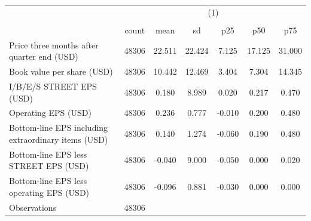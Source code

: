 {
\def\sym#1{\ifmmode^{#1}\else\(^{#1}\)\fi}
\begin{tabular}{l*{1}{cccccc}}
\hline\hline
                    &\multicolumn{6}{c}{(1)}                                                      \\
                    &\multicolumn{6}{c}{}                                                         \\
                    &       count&        mean&          sd&         p25&         p50&         p75\\
\hline
Price three months after quarter end (USD)&       48306&      22.511&      22.424&       7.125&      17.125&      31.000\\
Book value per share (USD)&       48306&      10.442&      12.469&       3.404&       7.304&      14.345\\
I/B/E/S STREET EPS (USD)&       48306&       0.180&       8.989&       0.020&       0.217&       0.470\\
Operating EPS (USD) &       48306&       0.236&       0.777&      -0.010&       0.200&       0.480\\
Bottom-line EPS including extraordinary items (USD)&       48306&       0.140&       1.274&      -0.060&       0.190&       0.480\\
Bottom-line EPS less STREET EPS (USD)&       48306&      -0.040&       9.000&      -0.050&       0.000&       0.020\\
Bottom-line EPS less operating EPS (USD)&       48306&      -0.096&       0.881&      -0.030&       0.000&       0.000\\
\hline
Observations        &       48306&            &            &            &            &            \\
\hline\hline
\end{tabular}
}
